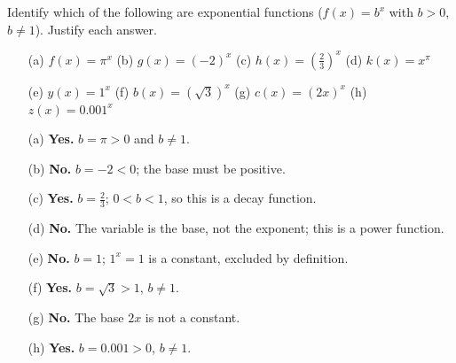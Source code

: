 \documentclass{ximera}
\begin{document}
\begin{problem}
Identify which of the following are exponential functions ($f(x)=b^x$ with $b>0$, $b\neq1$). Justify each answer.
\begin{enumerate}
  \item[(a)] $f(x)=\pi^x$ \quad (b) $g(x)=(-2)^x$ \quad (c) $h(x)=\left(\tfrac{2}{3}\right)^x$ \quad (d) $k(x)=x^\pi$
  \item[(e)] $y(x)=1^x$ \quad (f) $b(x)=(\sqrt{3})^x$ \quad (g) $c(x)=(2x)^x$ \quad (h) $z(x)=0.001^x$
\end{enumerate}

\begin{solution}
\begin{enumerate}
  \item[(a)] \textbf{Yes.} $b=\pi>0$ and $b\neq1$.
  \item[(b)] \textbf{No.} $b=-2<0$; the base must be positive.
  \item[(c)] \textbf{Yes.} $b=\tfrac{2}{3}$; $0<b<1$, so this is a decay function.
  \item[(d)] \textbf{No.} The variable is the base, not the exponent; this is a power function.
  \item[(e)] \textbf{No.} $b=1$; $1^x=1$ is a constant, excluded by definition.
  \item[(f)] \textbf{Yes.} $b=\sqrt{3}>1$, $b\neq1$.
  \item[(g)] \textbf{No.} The base $2x$ is not a constant.
  \item[(h)] \textbf{Yes.} $b=0.001>0$, $b\neq1$.
\end{enumerate}
\end{solution}
\end{problem}
\end{document}
